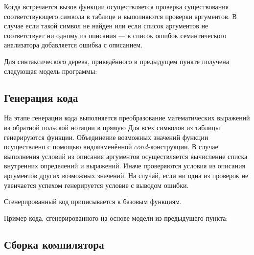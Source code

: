     Когда встречается вызов функции осуществляется проверка существования соответствующего символа в таблице и выполняются проверки аргументов.
    В случае если такой символ не найден или если список аргументов не соответствует ни одному из описания --- в список ошибок семантического анализатора добавляется ошибка с описанием.

    Для синтаксического дерева, приведённого в предыдущем пункте получена следующая модель программы:
    
    
    
    \subsection{Генерация кода}
    На этапе генерации кода выполняется преобразование математических выражений из обратной польской нотации в прямую
    Для всех символов из таблицы генерируются функции.
    Объединение возможных значений функции осуществлено с помощью видоизменённой $cond$-конструкции.
    В случае выполнения условий из описания аргументов осуществляется вычисление списка внутренних определений и выражений.
    Иначе проверяются условия из описания аргументов других возможных значений.
    На случай, если ни одна из проверок не увенчается успехом генерируется условие с выводом ошибки.

    Сгенерированный код приписывается к базовым функциям.

    Пример кода, сгенерированного на основе модели из предыдущего пункта:

    

    \subsection{Сборка компилятора}
